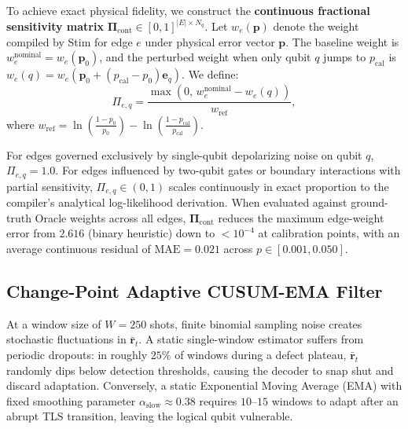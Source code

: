 \documentclass[aps,prxquantum,reprint,superscriptaddress,floatfix,nofootinbib]{revtex4-2}
\begin{document}
To achieve exact physical fidelity, we construct the \textbf{continuous fractional sensitivity matrix} $\mathbf{\Pi}_{\text{cont}} \in [0, 1]^{|E| \times N_q}$. Let $w_e(\mathbf{p})$ denote the weight compiled by Stim for edge $e$ under physical error vector $\mathbf{p}$. The baseline weight is $w_e^{\text{nominal}} = w_e(\mathbf{p}_0)$, and the perturbed weight when only qubit $q$ jumps to $p_{\text{cal}}$ is $w_e(q) = w_e(\mathbf{p}_0 + (p_{\text{cal}} - p_0)\mathbf{e}_q)$. We define:
\begin{equation}
    \Pi_{e, q} = \frac{\max\left(0, \, w_e^{\text{nominal}} - w_e(q)\right)}{w_{\text{ref}}},
    \label{eq:pi_cont_def}
\end{equation}
where $w_{\text{ref}} = \ln\left(\frac{1 - p_0}{p_0}\right) - \ln\left(\frac{1 - p_{\text{cal}}}{p_{\text{cal}}}\right)$. 

For edges governed exclusively by single-qubit depolarizing noise on qubit $q$, $\Pi_{e, q} = 1.0$. For edges influenced by two-qubit gates or boundary interactions with partial sensitivity, $\Pi_{e, q} \in (0, 1)$ scales continuously in exact proportion to the compiler's analytical log-likelihood derivation. When evaluated against ground-truth Oracle weights across all edges, $\mathbf{\Pi}_{\text{cont}}$ reduces the maximum edge-weight error from $2.616$ (binary heuristic) down to $<10^{-4}$ at calibration points, with an average continuous residual of $\text{MAE} = 0.021$ across $p \in [0.001, 0.050]$.

\subsection{Change-Point Adaptive CUSUM-EMA Filter}
\label{subsec:cusum_ema}
At a window size of $W = 250$ shots, finite binomial sampling noise creates stochastic fluctuations in $\bar{\mathbf{r}}_t$. A static single-window estimator suffers from periodic dropouts: in roughly $25\%$ of windows during a defect plateau, $\bar{\mathbf{r}}_t$ randomly dips below detection thresholds, causing the decoder to snap shut and discard adaptation. Conversely, a static Exponential Moving Average (EMA) with fixed smoothing parameter $\alpha_{\text{slow}} \approx 0.38$ requires $10\text{--}15$ windows to adapt after an abrupt TLS transition, leaving the logical qubit vulnerable.
\end{document}
